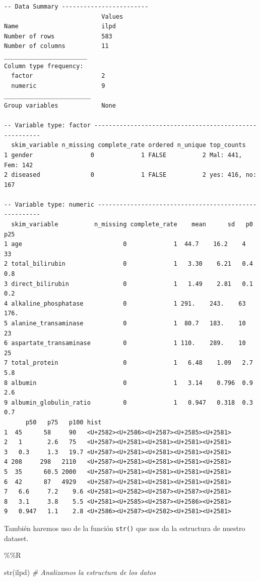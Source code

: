 \documentclass[
  11pt,
  a4paper,
]{article}
\newenvironment{Shaded}{\begin{snugshade}}{\end{snugshade}}
\newcommand{\CommentTok}[1]{\textcolor[rgb]{0.56,0.35,0.01}{\textit{#1}}}
\newcommand{\FunctionTok}[1]{\textcolor[rgb]{0.00,0.00,0.00}{#1}}
\newcommand{\NormalTok}[1]{#1}
\newcommand{\SpecialCharTok}[1]{\textcolor[rgb]{0.00,0.00,0.00}{#1}}
\begin{document}
\begin{verbatim}
-- Data Summary ------------------------
                           Values
Name                       ilpd  
Number of rows             583   
Number of columns          11    
_______________________          
Column type frequency:           
  factor                   2     
  numeric                  9     
________________________         
Group variables            None  

-- Variable type: factor -------------------------------------------------------
  skim_variable n_missing complete_rate ordered n_unique top_counts        
1 gender                0             1 FALSE          2 Mal: 441, Fem: 142
2 diseased              0             1 FALSE          2 yes: 416, no: 167 

-- Variable type: numeric ------------------------------------------------------
  skim_variable          n_missing complete_rate    mean      sd   p0   p25
1 age                            0             1  44.7    16.2    4    33  
2 total_bilirubin                0             1   3.30    6.21   0.4   0.8
3 direct_bilirubin               0             1   1.49    2.81   0.1   0.2
4 alkaline_phosphatase           0             1 291.    243.    63   176. 
5 alanine_transaminase           0             1  80.7   183.    10    23  
6 aspartate_transaminase         0             1 110.    289.    10    25  
7 total_protein                  0             1   6.48    1.09   2.7   5.8
8 albumin                        0             1   3.14    0.796  0.9   2.6
9 albumin_globulin_ratio         0             1   0.947   0.318  0.3   0.7
      p50   p75   p100 hist 
1  45      58     90   <U+2582><U+2586><U+2587><U+2585><U+2581>
2   1       2.6   75   <U+2587><U+2581><U+2581><U+2581><U+2581>
3   0.3     1.3   19.7 <U+2587><U+2581><U+2581><U+2581><U+2581>
4 208     298   2110   <U+2587><U+2581><U+2581><U+2581><U+2581>
5  35      60.5 2000   <U+2587><U+2581><U+2581><U+2581><U+2581>
6  42      87   4929   <U+2587><U+2581><U+2581><U+2581><U+2581>
7   6.6     7.2    9.6 <U+2581><U+2582><U+2587><U+2587><U+2581>
8   3.1     3.8    5.5 <U+2581><U+2585><U+2587><U+2586><U+2581>
9   0.947   1.1    2.8 <U+2586><U+2587><U+2582><U+2581><U+2581>
\end{verbatim}

También haremos uso de la función \texttt{str()} que nos da la
estructura de nuestro dataset.

\begin{Shaded}
\begin{Highlighting}[]
\SpecialCharTok{\%\%}\NormalTok{R}

\FunctionTok{str}\NormalTok{(ilpd) }\CommentTok{\# Analizamos la estructura de los datos}
\end{Highlighting}
\end{Shaded}
\end{document}
